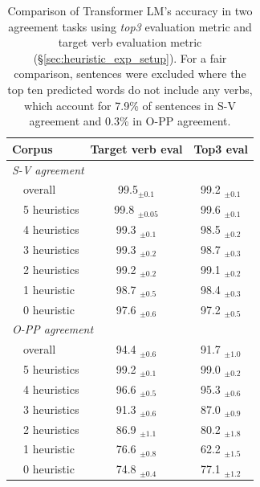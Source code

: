 \begin{table}[ht]
  \centering
  \begin{tabular}{llcc}
    \toprule
    \multicolumn{2}{l}{Corpus}  & Target verb eval & Top3 eval \\
    \midrule
    \multicolumn{4}{l}{\textit{S-V agreement}} \\
    \phantom{ab} & overall  & 99.5$_{\pm 0.1}$   & 99.2 $_{\pm 0.1}$ \\\cline{2-4}
    \phantom{ab} & 5 heuristics  &99.8 $_{\pm 0.05}$ & 99.6 $_{\pm 0.1}$ \\
    \phantom{ab} & 4 heuristics  &99.3 $_{\pm 0.1}$ & 98.5 $_{\pm 0.2}$ \\
    \phantom{ab} & 3 heuristics  & 99.3 $_{\pm 0.2}$ & 98.7 $_{\pm 0.3}$\\
    \phantom{ab} & 2 heuristics  & 99.2 $_{\pm 0.2}$& 99.1 $_{\pm 0.2}$\\    
    \phantom{ab} & 1 heuristic &98.7 $_{\pm 0.5}$& 98.4 $_{\pm 0.3}$\\
    \phantom{ab} & 0 heuristic &97.6 $_{\pm 0.6}$ & 97.2 $_{\pm 0.5}$\\
    \midrule
    \multicolumn{4}{l}{\textit{O-PP agreement}} \\
     & overall  & 94.4 $_{\pm 0.6}$  & 91.7 $_{\pm 1.0}$     \\\cline{2-4}
      & 5 heuristics  &99.2 $_{\pm 0.1}$ & 99.0 $_{\pm 0.2}$ \\
     & 4 heuristics  &96.6 $_{\pm 0.5}$ & 95.3 $_{\pm 0.6}$\\
     & 3 heuristics  & 91.3 $_{\pm 0.6}$& 87.0 $_{\pm 0.9}$\\
     & 2 heuristics  & 86.9 $_{\pm 1.1}$& 80.2 $_{\pm 1.8}$\\    
     & 1 heuristic &76.6 $_{\pm 0.8}$& 62.2  $_{\pm 1.5}$ \\
     & 0 heuristic  &74.8 $_{\pm 0.4}$& 77.1 $_{\pm 1.2}$\\
    \bottomrule
  \end{tabular}
\caption{Comparison of Transformer LM's accuracy in two agreement tasks using \textit{top3} evaluation metric and target verb evaluation metric (\S\ref{sec:heuristic_exp_setup}). For a fair comparison, sentences were excluded where the top ten predicted words do not include any verbs, which account for 7.9\% of sentences in S-V agreement and 0.3\% in O-PP agreement. \label{tab:tm_full_2_eval}
}
\end{table}




